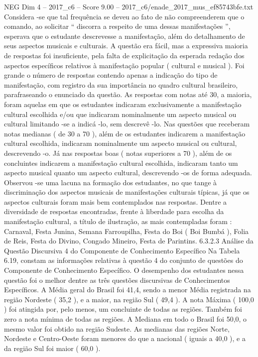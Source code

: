 \begin{textsample}{NEG Dim 4 – 2017\_c6 – Score 9.00 – 2017\_c6/enade\_2017\_mus\_ef85743bfe.txt}
Considera -se que tal frequência se deveu ao fato de não compreenderem que o comando, ao solicitar “ discorra a respeito de uma dessas manifestações ”, esperava que o estudante descrevesse a manifestação, além do detalhamento de seus aspectos musicais e culturais.
A questão era fácil, mas a expressiva maioria de respostas foi insuficiente, pela falta de explicitação da esperada redação dos aspectos específicos relativos à manifestação popular ( cultural e musical ).
Foi grande o número de respostas contendo apenas a indicação do tipo de manifestação, com registro da sua importância no quadro cultural brasileiro, parafraseando o enunciado da questão.
As respostas com notas até 30, a maioria, foram aquelas em que os estudantes indicaram exclusivamente a manifestação cultural escolhida e/ou que indicaram nominalmente um aspecto musical ou cultural limitando -se a indicá -lo, sem descrevê -lo.
Nas questões que receberam notas medianas ( de 30 a 70 ), além de os estudantes indicarem a manifestação cultural escolhida, indicaram nominalmente um aspecto musical ou cultural, descrevendo -o.
Já nas respostas boas ( notas superiores a 70 ), além de os concluintes indicarem a manifestação cultural escolhida, indicaram tanto um aspecto musical quanto um aspecto cultural, descrevendo -os de forma adequada.
Observou -se uma lacuna na formação dos estudantes, no que tange à discriminação dos aspectos musicais de manifestações culturais típicas, já que os aspectos culturais foram mais bem contemplados nas respostas.
Dentre a diversidade de respostas encontradas, frente à liberdade para escolha da manifestação cultural, a título de ilustração, as mais contempladas foram : Carnaval, Festa Junina, Semana Farroupilha, Festa do Boi ( Boi Bumbá ), Folia de Reis, Festa do Divino, Congado Mineiro, Festa de Parintins. 6.3.2.3 Análise da Questão Discursiva 4 do Componente de Conhecimento Específico Na Tabela 6.19, constam as informações relativas à questão 4 do conjunto de questões do Componente de Conhecimento Específico.
O desempenho dos estudantes nessa questão foi o melhor dentre as três questões discursivas de Conhecimentos Específicos.
A Média geral do Brasil foi 41,4, sendo a menor Média registrada na região Nordeste ( 35,2 ), e a maior, na região Sul ( 49,4 ).
A nota Máxima ( 100,0 ) foi atingida por, pelo menos, um concluinte de todas as regiões.
Também foi zero a nota mínima de todas as regiões.
A Mediana em todo o Brasil foi 50,0, o mesmo valor foi obtido na região Sudeste.
As medianas das regiões Norte, Nordeste e Centro-Oeste foram menores do que a nacional ( iguais a 40,0 ), e a da região Sul foi maior ( 60,0 ).

\end{textsample}
